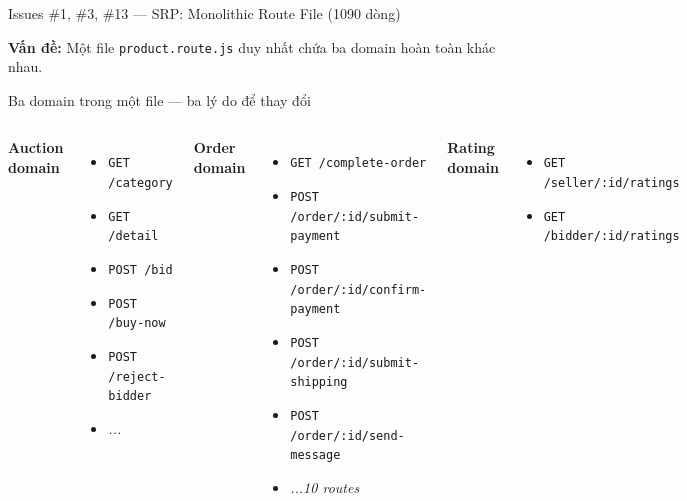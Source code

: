 \documentclass[12pt]{beamer}
\begin{document}
\begin{frame}{Issues \#1, \#3, \#13 — SRP: Monolithic Route File (1090 dòng)}

  \textbf{Vấn đề:} Một file \texttt{product.route.js} duy nhất chứa ba domain hoàn toàn khác nhau.

  \bigskip
  \begin{block}{Ba domain trong một file — ba lý do để thay đổi}
    \begin{columns}[t]
      \textbf{Auction domain}
      \begin{itemize}
        \small
        \item \texttt{GET /category}
        \item \texttt{GET /detail}
        \item \texttt{POST /bid}
        \item \texttt{POST /buy-now}
        \item \texttt{POST /reject-bidder}
        \item \textit{...}
      \end{itemize}

      \textbf{Order domain}
      \begin{itemize}
        \small
        \item \texttt{GET /complete-order}
        \item \texttt{POST /order/:id/submit-payment}
        \item \texttt{POST /order/:id/confirm-payment}
        \item \texttt{POST /order/:id/submit-shipping}
        \item \texttt{POST /order/:id/send-message}
        \item \textit{...10 routes}
      \end{itemize}

      \textbf{Rating domain}
      \begin{itemize}
        \small
        \item \texttt{GET /seller/:id/ratings}
        \item \texttt{GET /bidder/:id/ratings}
      \end{itemize}
    \end{columns}
  \end{block}


\end{frame}
\end{document}
